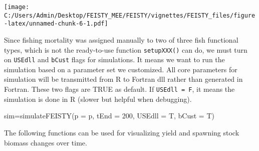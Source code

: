 \documentclass[
]{article}
\newenvironment{Shaded}{\begin{snugshade}}{\end{snugshade}}
\newcommand{\AttributeTok}[1]{\textcolor[rgb]{0.77,0.63,0.00}{#1}}
\newcommand{\CommentTok}[1]{\textcolor[rgb]{0.56,0.35,0.01}{\textit{#1}}}
\newcommand{\ConstantTok}[1]{\textcolor[rgb]{0.00,0.00,0.00}{#1}}
\newcommand{\DecValTok}[1]{\textcolor[rgb]{0.00,0.00,0.81}{#1}}
\newcommand{\FunctionTok}[1]{\textcolor[rgb]{0.00,0.00,0.00}{#1}}
\newcommand{\NormalTok}[1]{#1}
\newcommand{\OtherTok}[1]{\textcolor[rgb]{0.56,0.35,0.01}{#1}}
\newcommand{\SpecialCharTok}[1]{\textcolor[rgb]{0.00,0.00,0.00}{#1}}
\newcommand{\StringTok}[1]{\textcolor[rgb]{0.31,0.60,0.02}{#1}}
\begin{document}
\begin{Shaded}
\end{Shaded}

\texttt{[image: C:/Users/Admin/Desktop/FEISTY\_MEE/FEISTY/vignettes/FEISTY\_files/figure-latex/unnamed-chunk-6-1.pdf]}

Since fishing mortality was assigned manually to two of three fish
functional types, which is not the ready-to-use function
\texttt{setupXXX()} can do, we must turn on \texttt{USEdll} and
\texttt{bCust} flags for simulations. It means we want to run the
simulation based on a parameter set we customized. All core parameters
for simulation will be transmitted from R to Fortran dll rather than
generated in Fortran. These two flags are TRUE as default. If
\texttt{USEdll\ =\ F}, it means the simulation is done in R (slower but
helpful when debugging).

\begin{Shaded}
\begin{Highlighting}[]
\NormalTok{sim}\OtherTok{=}\FunctionTok{simulateFEISTY}\NormalTok{(}\AttributeTok{p =}\NormalTok{ p, }\AttributeTok{tEnd =} \DecValTok{200}\NormalTok{, }\AttributeTok{USEdll =}\NormalTok{ T, }\AttributeTok{bCust =}\NormalTok{ T)}
\end{Highlighting}
\end{Shaded}

The following functions can be used for visualizing yield and spawning
stock biomass changes over time.
\end{document}
